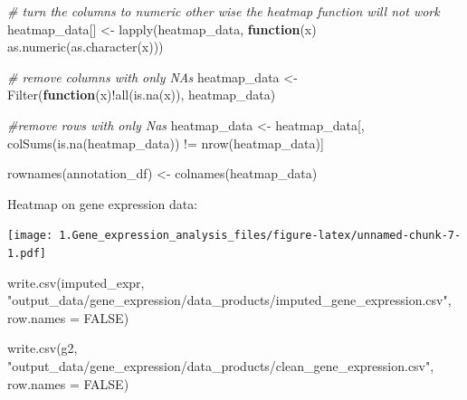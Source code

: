 \documentclass[
]{article}
\newenvironment{Shaded}{\begin{snugshade}}{\end{snugshade}}
\newcommand{\AttributeTok}[1]{\textcolor[rgb]{0.77,0.63,0.00}{#1}}
\newcommand{\CommentTok}[1]{\textcolor[rgb]{0.56,0.35,0.01}{\textit{#1}}}
\newcommand{\ConstantTok}[1]{\textcolor[rgb]{0.00,0.00,0.00}{#1}}
\newcommand{\ControlFlowTok}[1]{\textcolor[rgb]{0.13,0.29,0.53}{\textbf{#1}}}
\newcommand{\FunctionTok}[1]{\textcolor[rgb]{0.00,0.00,0.00}{#1}}
\newcommand{\NormalTok}[1]{#1}
\newcommand{\OtherTok}[1]{\textcolor[rgb]{0.56,0.35,0.01}{#1}}
\newcommand{\SpecialCharTok}[1]{\textcolor[rgb]{0.00,0.00,0.00}{#1}}
\newcommand{\StringTok}[1]{\textcolor[rgb]{0.31,0.60,0.02}{#1}}
\begin{document}
\begin{Shaded}
\begin{Highlighting}[]
 \CommentTok{\# turn the columns to numeric other wise the heatmap function will not work}
\NormalTok{ heatmap\_data[] }\OtherTok{\textless{}{-}} \FunctionTok{lapply}\NormalTok{(heatmap\_data, }\ControlFlowTok{function}\NormalTok{(x) }\FunctionTok{as.numeric}\NormalTok{(}\FunctionTok{as.character}\NormalTok{(x)))}

 \CommentTok{\# remove columns with only NAs }
\NormalTok{ heatmap\_data }\OtherTok{\textless{}{-}} \FunctionTok{Filter}\NormalTok{(}\ControlFlowTok{function}\NormalTok{(x)}\SpecialCharTok{!}\FunctionTok{all}\NormalTok{(}\FunctionTok{is.na}\NormalTok{(x)), heatmap\_data) }
 
 \CommentTok{\#remove rows with only Nas}
\NormalTok{ heatmap\_data }\OtherTok{\textless{}{-}}\NormalTok{  heatmap\_data[, }\FunctionTok{colSums}\NormalTok{(}\FunctionTok{is.na}\NormalTok{(heatmap\_data)) }\SpecialCharTok{!=} \FunctionTok{nrow}\NormalTok{(heatmap\_data)]}

\FunctionTok{rownames}\NormalTok{(annotation\_df) }\OtherTok{\textless{}{-}} \FunctionTok{colnames}\NormalTok{(heatmap\_data)}
\end{Highlighting}
\end{Shaded}

Heatmap on gene expression data:

\texttt{[image: 1.Gene\_expression\_analysis\_files/figure-latex/unnamed-chunk-7-1.pdf]}

\begin{Shaded}
\begin{Highlighting}[]
\FunctionTok{write.csv}\NormalTok{(imputed\_expr, }\StringTok{"output\_data/gene\_expression/data\_products/imputed\_gene\_expression.csv"}\NormalTok{, }\AttributeTok{row.names =} \ConstantTok{FALSE}\NormalTok{)}

\FunctionTok{write.csv}\NormalTok{(g2, }\StringTok{"output\_data/gene\_expression/data\_products/clean\_gene\_expression.csv"}\NormalTok{, }\AttributeTok{row.names =} \ConstantTok{FALSE}\NormalTok{)}
\end{Highlighting}
\end{Shaded}
\end{document}
